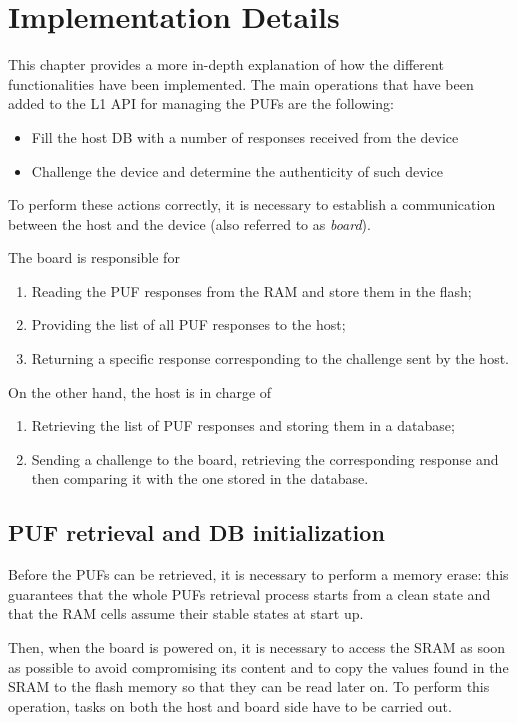 \chapter{Implementation Details}
This chapter provides a more in-depth explanation of how the different functionalities have been implemented. The main operations that have been added to the L1 API for managing the PUFs are the following:
\begin{itemize}
	\item Fill the host DB with a number of responses received from the device
 	\item Challenge the device and determine the authenticity of such device  
\end{itemize}

To perform these actions correctly, it is necessary to establish a communication between the host and the device (also referred to as \emph{board}). 

The board is responsible for
\begin{enumerate}
	\item Reading the PUF responses from the RAM and store them in the flash;
	\item Providing the list of all PUF responses to the host;
	\item Returning a specific response corresponding to the challenge sent by the host.
\end{enumerate}

On the other hand, the host is in charge of
\begin{enumerate}
	\item Retrieving the list of PUF responses and storing them in a database;
	\item Sending a challenge to the board, retrieving the corresponding response and then comparing it with the one stored in the database.
\end{enumerate}


\section {PUF retrieval and DB initialization}
Before the PUFs can be retrieved, it is necessary to perform a memory erase: this guarantees that the whole PUFs retrieval process starts from a clean state and that the RAM cells assume their stable states at start up.

Then, when the board is powered on, it is necessary to access the SRAM as soon as possible to avoid compromising its content and to copy the values found in the SRAM to the flash memory so that they can be read later on. To perform this operation, tasks on both the host and board side have to be carried out.



